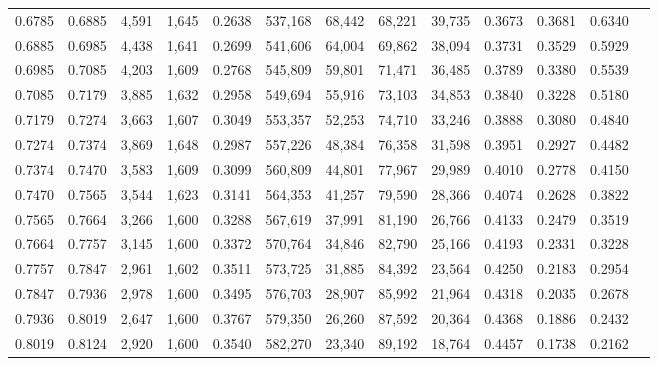 \begin{tabular}{rrrrrrrrrrrrr}
0.6785 & 0.6885 &  4,591 & 1,645 &                                     0.2638 & 537,168 &  68,442 &  68,221 &  39,735 & 0.3673 & 0.3681 & 0.6340 \\
0.6885 & 0.6985 &  4,438 & 1,641 &                                     0.2699 & 541,606 &  64,004 &  69,862 &  38,094 & 0.3731 & 0.3529 & 0.5929 \\
0.6985 & 0.7085 &  4,203 & 1,609 &                                     0.2768 & 545,809 &  59,801 &  71,471 &  36,485 & 0.3789 & 0.3380 & 0.5539 \\
0.7085 & 0.7179 &  3,885 & 1,632 &                                     0.2958 & 549,694 &  55,916 &  73,103 &  34,853 & 0.3840 & 0.3228 & 0.5180 \\
0.7179 & 0.7274 &  3,663 & 1,607 &                                     0.3049 & 553,357 &  52,253 &  74,710 &  33,246 & 0.3888 & 0.3080 & 0.4840 \\
0.7274 & 0.7374 &  3,869 & 1,648 &                                     0.2987 & 557,226 &  48,384 &  76,358 &  31,598 & 0.3951 & 0.2927 & 0.4482 \\
0.7374 & 0.7470 &  3,583 & 1,609 &                                     0.3099 & 560,809 &  44,801 &  77,967 &  29,989 & 0.4010 & 0.2778 & 0.4150 \\
0.7470 & 0.7565 &  3,544 & 1,623 &                                     0.3141 & 564,353 &  41,257 &  79,590 &  28,366 & 0.4074 & 0.2628 & 0.3822 \\
0.7565 & 0.7664 &  3,266 & 1,600 &                                     0.3288 & 567,619 &  37,991 &  81,190 &  26,766 & 0.4133 & 0.2479 & 0.3519 \\
0.7664 & 0.7757 &  3,145 & 1,600 &                                     0.3372 & 570,764 &  34,846 &  82,790 &  25,166 & 0.4193 & 0.2331 & 0.3228 \\
0.7757 & 0.7847 &  2,961 & 1,602 &                                     0.3511 & 573,725 &  31,885 &  84,392 &  23,564 & 0.4250 & 0.2183 & 0.2954 \\
0.7847 & 0.7936 &  2,978 & 1,600 &                                     0.3495 & 576,703 &  28,907 &  85,992 &  21,964 & 0.4318 & 0.2035 & 0.2678 \\
0.7936 & 0.8019 &  2,647 & 1,600 &                                     0.3767 & 579,350 &  26,260 &  87,592 &  20,364 & 0.4368 & 0.1886 & 0.2432 \\
0.8019 & 0.8124 &  2,920 & 1,600 &                                     0.3540 & 582,270 &  23,340 &  89,192 &  18,764 & 0.4457 & 0.1738 & 0.2162 \\

\end{tabular}
